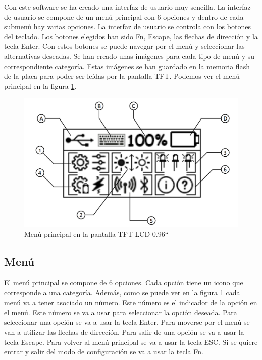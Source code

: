 Con este software se ha creado una interfaz de usuario muy sencilla. La interfaz de usuario se compone de un menú principal con 6 opciones y dentro de cada submenú hay varias opciones. La interfaz de usuario se controla con los botones del teclado. Los botones elegidos han sido Fn, Escape, las flechas de dirección y la tecla Enter. Con estos botones se puede navegar por el menú y seleccionar las alternativas deseadas. Se han creado unas imágenes para cada tipo de menú y su correspondiente categoría. Estas imágenes se han guardado en la memoria flash de la placa para poder ser leídas por la pantalla \gls{TFT}. Podemos ver el menú principal en la figura \ref{fig:MenuPrincipal}.

\begin{figure}[H]
\centering
\includegraphics[width=1\textwidth]{imagenes/Capitulos/Cap07/PantallaMenuPrincipal.png}
\caption{Menú principal en la pantalla \gls{TFT} LCD 0.96``}
\label{fig:MenuPrincipal}
\end{figure}

\subsection{Menú}

El menú principal se compone de 6 opciones. Cada opción tiene un icono que corresponde a una categoría. Además, como se puede ver en la figura \ref{fig:MenuPrincipal} cada menú va a tener asociado un número. Este número es el indicador de la opción en el menú. Este número se va a usar para seleccionar la opción deseada. Para seleccionar una opción se va a usar la tecla Enter. Para moverse por el menú se van a utilizar las flechas de dirección. Para salir de una opción se va a usar la tecla Escape. Para volver al menú principal se va a usar la tecla ESC. Si se quiere entrar y salir del modo de configuración se va a usar la tecla Fn.

